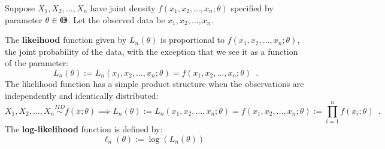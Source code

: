 \begin{definition}\label{D:LklFn}
Suppose $X_1,X_2,\ldots,X_n$ have joint density $f(x_1,x_2,\ldots,x_n; \theta)$ specified by parameter $\theta \in {\Theta}\mspace{-11 mu}{\Theta}$.  Let the observed data be $x_1,x_2,\ldots,x_n$.  

The {\bf likeihood} function given by $L_n(\theta)$ is proportional to $f(x_1,x_2,\ldots,x_n; \theta)$, the joint probability of the data, with the exception that we see it as a function of the parameter:
\begin{equation}
L_n(\theta) := L_n(x_1,x_2,\ldots,x_n; \theta) = f(x_1,x_2,\ldots,x_n; \theta) \enspace .
\end{equation}
The likelihood function has a simple product structure when the observations are independently and identically distributed:
\begin{equation}
X_1,X_2,\ldots,X_n \overset{IID}{\sim} f(x;\theta) \implies 
\boxed{
L_n(\theta) := L_n(x_1,x_2,\ldots,x_n;\theta) = f(x_1,x_2,\ldots,x_n; \theta) := \prod_{i=1}^n f(x_i ; \theta)  
}
\enspace .
\end{equation}
The {\bf log-likelihood} function is defined by:
\begin{equation}
\boxed{
\ell_n(\theta) := \log(L_n(\theta))
} \enspace
\end{equation}
\end{definition}

